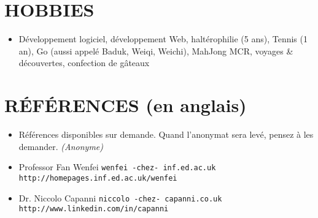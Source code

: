 \documentclass{res}
\begin{document}
\begin{resume}
\section{HOBBIES}         
	\begin{itemize}
		\item[] D\'eveloppement logiciel, d\'eveloppement Web, halt\'erophilie (5 ans), Tennis (1 an), Go (aussi appel\'e Baduk, Weiqi, Weichi), MahJong MCR, voyages \& d\'ecouvertes, confection de g\^ateaux
	\end{itemize}

\section{R\'EF\'ERENCES (en anglais)}
\ifisanon 
    \begin{itemize}
			\item[] R\'ef\'erences disponibles sur demande. Quand l'anonymat sera lev\'e, pensez \`a les demander. \textit{(Anonyme)}
    \end{itemize}
\else
		\begin{itemize}
			\item[] Professor Fan Wenfei \tabto{4cm} \texttt{wenfei -chez- inf.ed.ac.uk} \hfill \texttt{http://homepages.inf.ed.ac.uk/wenfei}
			\item[] Dr. Niccolo Capanni \tabto{4cm} \texttt{niccolo -chez- capanni.co.uk} \hfill \texttt{http://www.linkedin.com/in/capanni}
		\end{itemize}
\fi
\end{resume}
\end{document}
